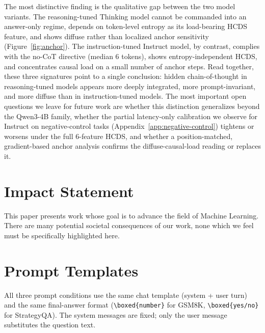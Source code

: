 \documentclass{article}
\theoremstyle{plain}
\theoremstyle{definition}
\theoremstyle{remark}
\begin{document}
The most distinctive finding is the qualitative gap between the two model variants. The reasoning-tuned Thinking model cannot be commanded into an answer-only regime, depends on token-level entropy as its load-bearing HCDS feature, and shows diffuse rather than localized anchor sensitivity (Figure~\ref{fig:anchor}). The instruction-tuned Instruct model, by contrast, complies with the no-CoT directive (median 6 tokens), shows entropy-independent HCDS, and concentrates causal load on a small number of anchor steps. Read together, these three signatures point to a single conclusion: hidden chain-of-thought in reasoning-tuned models appears more deeply integrated, more prompt-invariant, and more diffuse than in instruction-tuned models. The most important open questions we leave for future work are whether this distinction generalizes beyond the Qwen3-4B family, whether the partial latency-only calibration we observe for Instruct on negative-control tasks (Appendix~\ref{app:negative-control}) tightens or worsens under the full 6-feature HCDS, and whether a position-matched, gradient-based anchor analysis confirms the diffuse-causal-load reading or replaces it.

\section*{Impact Statement}

This paper presents work whose goal is to advance the field of Machine
Learning. There are many potential societal consequences of our work, none
which we feel must be specifically highlighted here.





\clearpage
\appendix

\section{Prompt Templates}
\label{app:prompts}

All three prompt conditions use the same chat template (system + user
turn) and the same final-answer format
(\texttt{\textbackslash boxed\{number\}} for GSM8K,
\texttt{\textbackslash boxed\{yes/no\}} for StrategyQA). The system messages are
fixed; only the user message substitutes the question text.
\end{document}
